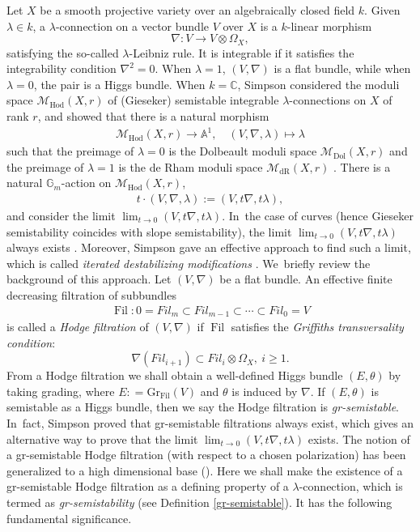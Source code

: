 \documentclass[JEP,XML,SOM,Unicode,published]{cedram}
\newcommand{\Fil}{\textit{Fil}}
\newcommand{\lconnection}{$\lambda$\nobreakdash-con\-nec\-tion\xspace}
\newcommand{\lconnections}{$\lambda$\nobreakdash-con\-nec\-tions\xspace}
\newcommand{\grsemistable}{gr\nobreakdash-semi\-stable\xspace}
\newcommand{\Dol}{\mathrm{Dol}}
\newcommand{\dR}{\mathrm{dR}}
\newcommand{\Hod}{\mathrm{Hod}}
\DeclareMathOperator{\Filt}{Fil}
\newcommand{\Gr}{\mathrm{Gr}}
\theoremstyle{plain}
\theoremstyle{definition}
\begin{document}
Let $X$ be a smooth projective variety over an algebraically closed field $k$. Given $\lambda \in k$, a \lconnection on a vector bundle $V$ over $X$ is a $k$-linear morphism
\[
\nabla: V \to V \otimes \Omega_X,
\]
satisfying the so-called $\lambda$-Leibniz rule. It is integrable if it satisfies the integrability condition $\nabla^2=0$. When $\lambda=1$, $(V,\nabla)$ is a flat bundle, while when $\lambda=0$, the pair is a Higgs bundle. When $k=\mathbb{C}$, Simpson considered the moduli space $\mathcal{M}_\Hod(X,r)$ of (Gieseker) semistable integrable \lconnections on $X$ of rank $r$, and showed that there is a natural morphism
\begin{align*}
\mathcal{M}_\Hod(X,r) \to \mathbb{A}^1, \quad (V,\nabla,\lambda) \mapsto \lambda
\end{align*}
such that the preimage of $\lambda=0$ is the Dolbeault moduli space $\mathcal{M}_\Dol(X,r)$ and the preimage of $\lambda=1$ is the de Rham moduli space $\mathcal{M}_\dR(X,r)$ \cite[Prop.\,4.1]{Si97}. There is a natural $\mathbb{G}_m$-action on $\mathcal{M}_\Hod(X,r)$, \ie
\begin{align*}
t \cdot (V,\nabla,\lambda) := (V, t\nabla, t\lambda),
\end{align*}
and consider the limit $\lim_{t \to 0} (V, t\nabla, t\lambda)$. In~the case of curves (hence Gieseker semistability coincides with slope semistability), the limit $\lim_{t \to 0} (V, t\nabla, t\lambda)$ always exists \cite[Lem.\,4.1]{S10}. Moreover, Simpson gave an effective approach to find such a limit, which is called \emph{iterated destabilizing modifications} \cite{S10}. We~briefly review the background of this approach. Let $(V,\nabla)$ be a flat bundle. An effective finite decreasing filtration of subbundles
\begin{align*}
\Filt: 0=\Fil_m \subset \Fil_{m-1} \subset \cdots \subset \Fil_0=V
\end{align*}
is called a \emph{Hodge filtration} of $(V,\nabla)$ if $\Filt$ satisfies the \emph{Griffiths transversality condition}:
\[
\nabla(\Fil_{i+1})\subset \Fil_{i}\otimes \Omega_X, \ i \geq 1.
\]
From a Hodge filtration we shall obtain a well-defined Higgs bundle $(E,\theta)$ by taking grading, where $E: = \Gr_{\Filt}(V)$ and $\theta$ is induced by $\nabla$. If $(E,\theta)$ is semistable as a Higgs bundle, then we say the Hodge filtration is \emph{\grsemistable}. In~fact, Simpson proved that \grsemistable filtrations always exist, which gives an alternative way to prove that the limit $\lim_{t \to 0} (V, t\nabla, t\lambda)$ exists. The notion of a \grsemistable Hodge filtration (with respect to a chosen polarization) has been generalized to a high dimensional base (\cite{LSZ19,L13}). Here we shall make the existence of a \grsemistable Hodge filtration as a defining property of a \lconnection, which is termed as \emph{gr-semistability} (see Definition \ref{gr-semistable}). It has the following fundamental significance.
\end{document}
